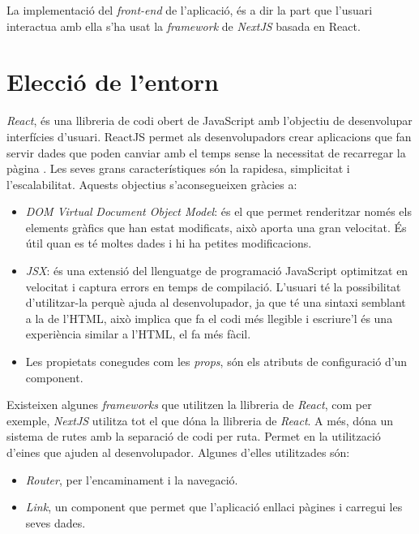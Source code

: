 La implementació del \emph{front-end} de l'aplicació, és a dir
la part que l'usuari interactua amb ella s'ha usat la \emph{framework} de \emph{NextJS}
\autocite{nextjs} basada en React.

\section{Elecció de l'entorn}

\emph{React}, és una llibreria de codi obert de JavaScript amb l'objectiu de desenvolupar interfícies d'usuari.
ReactJS permet als desenvolupadors crear aplicacions que fan servir dades que poden canviar
amb el temps sense la necessitat de recarregar la pàgina \autocite{react}. Les seves grans característiques
són la rapidesa, simplicitat i l'escalabilitat. Aquests objectius s'aconsegueixen gràcies a:

\begin{itemize}
    \item \emph{DOM Virtual} \emph{Document Object Model}: és el que permet renderitzar només
    els elements gràfics que han estat modificats, això aporta una gran velocitat. És
    útil quan es té moltes dades i hi ha petites modificacions.
    \item \emph{JSX}: és una extensió del llenguatge de programació JavaScript optimitzat
    en velocitat i captura errors en temps de compilació. L'usuari té la possibilitat
    d'utilitzar-la perquè ajuda al desenvolupador, ja que té una sintaxi semblant a la de
    l'HTML, això implica que fa el codi més llegible i escriure'l és una experiència
    similar a l'HTML, el fa més fàcil.
    \item Les propietats conegudes com les \emph{props}, són els atributs de configuració
    d'un component.
\end{itemize}


Existeixen algunes \emph{frameworks} que utilitzen la llibreria de \emph{React}, com per exemple,
\emph{NextJS} utilitza tot el que dóna la llibreria de \emph{React}. A més, dóna un sistema
de rutes amb la separació de codi per ruta. Permet en la utilització d'eines que ajuden al
desenvolupador. Algunes d'elles utilitzades són:

\begin{itemize}
    \item \emph{Router}, per l'encaminament i la navegació.
    \item \emph{Link}, un component que permet que l'aplicació enllaci pàgines i carregui les
    seves dades.
\end{itemize}

